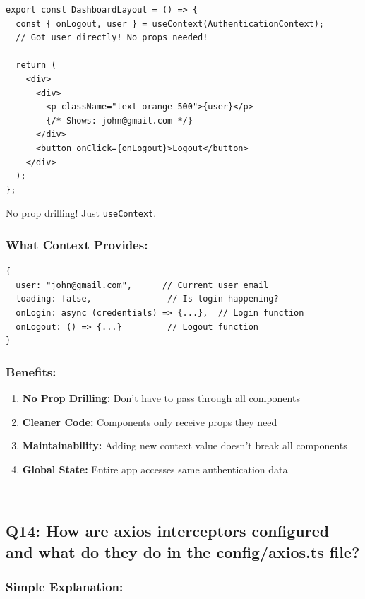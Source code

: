 \documentclass[12pt]{article}
\begin{document}
\begin{lstlisting}
export const DashboardLayout = () => {
  const { onLogout, user } = useContext(AuthenticationContext);
  // Got user directly! No props needed!
  
  return (
    <div>
      <div>
        <p className="text-orange-500">{user}</p>
        {/* Shows: john@gmail.com */}
      </div>
      <button onClick={onLogout}>Logout</button>
    </div>
  );
};
\end{lstlisting}

No prop drilling! Just \texttt{useContext}.

\subsubsection*{What Context Provides:}

\begin{lstlisting}
{
  user: "john@gmail.com",      // Current user email
  loading: false,               // Is login happening?
  onLogin: async (credentials) => {...},  // Login function
  onLogout: () => {...}         // Logout function
}
\end{lstlisting}

\subsubsection*{Benefits:}

\begin{enumerate}
    \item \textbf{No Prop Drilling:} Don't have to pass through all components
    \item \textbf{Cleaner Code:} Components only receive props they need
    \item \textbf{Maintainability:} Adding new context value doesn't break all components
    \item \textbf{Global State:} Entire app accesses same authentication data
\end{enumerate}

---

\subsection{Q14: How are axios interceptors configured and what do they do in the config/axios.ts file?}

\subsubsection*{Simple Explanation:}
\end{document}
